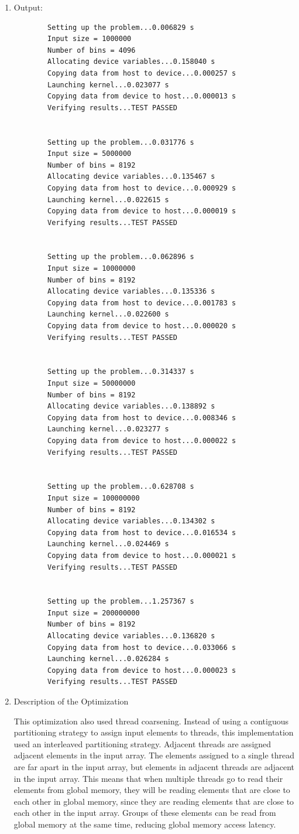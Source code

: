 \documentclass{article}
\begin{document}
\begin{enumerate}
	\item Output:
	\begin{verbatim}
		Setting up the problem...0.006829 s
		Input size = 1000000
		Number of bins = 4096
		Allocating device variables...0.158040 s
		Copying data from host to device...0.000257 s
		Launching kernel...0.023077 s
		Copying data from device to host...0.000013 s
		Verifying results...TEST PASSED
		
		
		Setting up the problem...0.031776 s
		Input size = 5000000
		Number of bins = 8192
		Allocating device variables...0.135467 s
		Copying data from host to device...0.000929 s
		Launching kernel...0.022615 s
		Copying data from device to host...0.000019 s
		Verifying results...TEST PASSED
		
		
		Setting up the problem...0.062896 s
		Input size = 10000000
		Number of bins = 8192
		Allocating device variables...0.135336 s
		Copying data from host to device...0.001783 s
		Launching kernel...0.022600 s
		Copying data from device to host...0.000020 s
		Verifying results...TEST PASSED
		
		
		Setting up the problem...0.314337 s
		Input size = 50000000
		Number of bins = 8192
		Allocating device variables...0.138892 s
		Copying data from host to device...0.008346 s
		Launching kernel...0.023277 s
		Copying data from device to host...0.000022 s
		Verifying results...TEST PASSED
		
		
		Setting up the problem...0.628708 s
		Input size = 100000000
		Number of bins = 8192
		Allocating device variables...0.134302 s
		Copying data from host to device...0.016534 s
		Launching kernel...0.024469 s
		Copying data from device to host...0.000021 s
		Verifying results...TEST PASSED
		
		
		Setting up the problem...1.257367 s
		Input size = 200000000
		Number of bins = 8192
		Allocating device variables...0.136820 s
		Copying data from host to device...0.033066 s
		Launching kernel...0.026284 s
		Copying data from device to host...0.000023 s
		Verifying results...TEST PASSED
	\end{verbatim}
	
	\item Description of the Optimization
	
	This optimization also used thread coarsening. Instead of using a contiguous partitioning strategy to assign input elements to threads, this implementation used an interleaved partitioning strategy. Adjacent threads are assigned adjacent elements in the input array. The elements assigned to a single thread are far apart in the input array, but elements in adjacent threads are adjacent in the input array. This means that when multiple threads go to read their elements from global memory, they will be reading elements that are close to each other in global memory, since they are reading elements that are close to each other in the input array. Groups of these elements can be read from global memory at the same time, reducing global memory access latency.
	

\end{enumerate}
\end{document}

